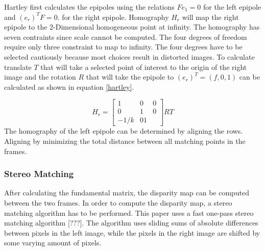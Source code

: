 \documentclass[a4paper]{article}
\begin{document}
Hartley first calculates the epipoles using the relations $Fe_1 = 0$ for the left epipole and $(e_r)^T F = 0$. for the right epipole. Homography $H_r$ will map the right epipole to the 2-Dimensional homogeneous point at infinity. The homography has seven contraints since scale cannot be computed. The four degrees of freedom require only three constraint to map to infinity. The four degrees have to be selected cautiously because most choices result in distorted images. 
To calculate translate $T$ that will take a selected point of interest to the origin of the right image and the rotation $R$ that will take the epipole to $(e_r)^T = ( f,0,1)$ can be calculated as shown in equation \ref{hartley}.

\begin{equation}
\label{hartley}
H_r = \begin{bmatrix}
1 & 0 & 0\\
0 & 1 & 0\\
-1/k & 0 1
\end{bmatrix}RT
\end{equation}
The homography of the left epipole can be determined by aligning the rows. Aligning by minimizing the total distance between all matching points in the frames.

\subsubsection{Stereo Matching}
After calculating the fundamental matrix, the disparity map can be computed between the two frames. In order to compute the disparity map, a stereo matching algorithm has to be performed. This paper uses a fast one-pass stereo matching algorithm [???]. The algorithm uses sliding sums of absolute differences between pixels in the left image, while the pixels in the right image are shifted by some varying amount of pixels.
\end{document}
